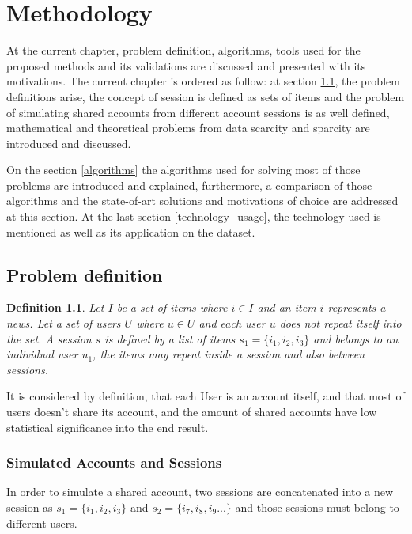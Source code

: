 \documentclass[ecp,tc,english]{iiufrgs}
\newtheorem{definition}{Definition}
\begin{document}


\chapter{Methodology} \label{methodology}
At the current chapter, problem definition, algorithms, tools used for the proposed methods and its validations are discussed and presented with its motivations. The current chapter is ordered as follow: at section \ref{problem_definition}, the problem definitions arise, the concept of session is defined as sets of items and the problem of simulating shared accounts from different account sessions is as well defined, mathematical and theoretical problems from data scarcity and sparcity are introduced and discussed.

On the section \ref{algorithms} the algorithms used for solving most of those problems are introduced and explained, furthermore, a comparison of those algorithms and the state-of-art solutions and motivations of choice are addressed at this section. At the last section \ref{technology_usage}, the technology used is mentioned as well as its application on the dataset.

    \section{Problem definition} \label{problem_definition}
    \begin{definition}
    Let \(I \) be a set of items where \(i \in I \) and an item \(i\) represents a news. Let a set of users \(U\) where \(u \in U \) and each user \(u\) does not repeat itself into the set.
    A session \(s\) is defined by a list of items \(s_{1} = \{i_{1}, i_{2}, i_{3}\}\) and belongs to an individual user \(u_{1}\), the items may repeat inside a session and also between sessions.
    \end{definition}
    
    It is considered by definition, that each User is an account itself, and that most of users doesn't share its account, and the amount of shared accounts have low  statistical significance into the end result.
    
        \subsection{Simulated Accounts and Sessions}
        In order to simulate a shared account, two sessions are concatenated into a new session as \(s_{1} = \{i_{1}, i_{2}, i_{3}\}\) and  \(s_{2} = \{i_{7}, i_{8}, i_{9} ...\}\) and those sessions must belong to different users.
    
\end{document}
